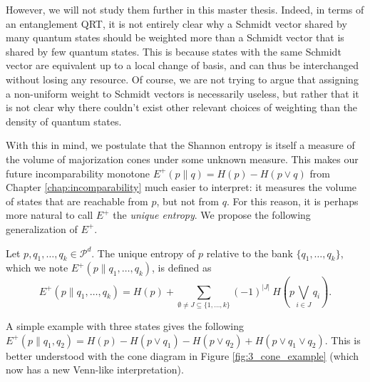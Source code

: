 However, we will not study them further in this master thesis. Indeed, in terms of an entanglement QRT, it is not entirely clear why a Schmidt vector shared by many quantum states should be weighted more than a Schmidt vector that is shared by few quantum states. This is because states with the same Schmidt vector are equivalent up to a local change of basis, and can thus be interchanged without losing any resource. Of course, we are not trying to argue that assigning a non-uniform weight to Schmidt vectors is necessarily useless, but rather that it is not clear why there couldn't exist other relevant choices of weighting than the density of quantum states.

With this in mind, we postulate that the Shannon entropy is itself a measure of the volume of majorization cones under some unknown measure. This makes our future incomparability monotone $E^+(p \parallel q) = H(p) - H(p \vee q)$ from Chapter \ref{chap:incomparability} much easier to interpret: it measures the volume of states that are reachable from $p$, but not from $q$. For this reason, it is perhaps more natural to call $E^+$ the \textit{unique entropy}. We propose the following generalization of $E^+$.

\begin{definition} \label{def:unique_entropy}
    Let $p, q_1, \dots, q_k \in \mathcal{P}^d$. The unique entropy of $p$ relative to the bank $\{q_1, \dots, q_k\}$, which we note $E^+(p \parallel q_1, \dots, q_k)$, is defined as 
    \begin{equation} \label{eq:unique_entropy}
        E^+(p \parallel q_1, \dots, q_k) = H(p) + \sum_{\emptyset \neq J \subseteq \{1, \dots, k\}} (-1)^{|J|} \: H\left(p \bigvee\limits_{i \in J} q_i\right).
    \end{equation}
\end{definition}

A simple example with three states gives the following $E^+(p \parallel q_1, q_2) = H(p) - H(p \vee q_1) - H(p \vee q_2) + H(p \vee q_1 \vee q_2)$. This is better understood with the cone diagram in Figure \ref{fig:3_cone_example} (which now has a new Venn-like interpretation).

